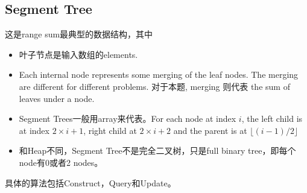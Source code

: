 \subsection{Segment Tree}
这是range sum最典型的数据结构，其中
\begin{itemize}
\item 叶子节点是输入数组的elements.
\item Each internal node represents some merging of the leaf nodes. The merging are different for different problems. 对于本题, merging 则代表 the sum of leaves under a node.
\item Segment Trees一般用array来代表。For each node at index $i$, the left child is at index $2\times i+1$, right child at $2\times i+2$ and the parent is at $ \lfloor (i-1)/2\rfloor $ 
\item 和Heap不同，Segment Tree不是完全二叉树，只是full binary tree，即每个node有0或者2 nodes。
\end{itemize}
具体的算法包括Construct，Query和Update。
